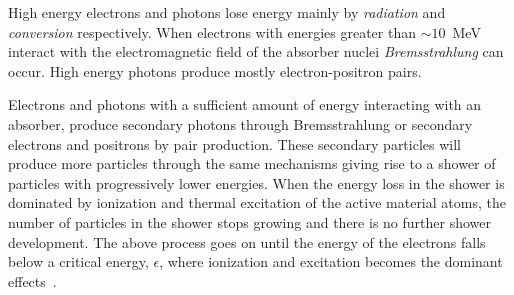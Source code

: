 High energy electrons and photons lose energy mainly by \emph{radiation} and
\emph{conversion} respectively. When electrons with energies greater than
$\sim 10$~MeV interact with the electromagnetic field of the absorber nuclei
\emph{Bremsstrahlung} can occur. High energy photons produce mostly
electron-positron pairs.

Electrons and photons with a sufficient amount of energy interacting with an
absorber, produce secondary photons through Bremsstrahlung or secondary
electrons and positrons by pair production. These secondary particles will
produce more particles through the same mechanisms giving rise to a shower of
particles with progressively lower energies. When the energy loss in the shower
is dominated by ionization and thermal excitation of the active material atoms,
the number of particles in the shower stops growing and there is no further
shower development. The above process goes on until the energy of the electrons
falls below a critical energy, $\epsilon$, where ionization and excitation
becomes the dominant effects~\cite{Calorimetry}.
